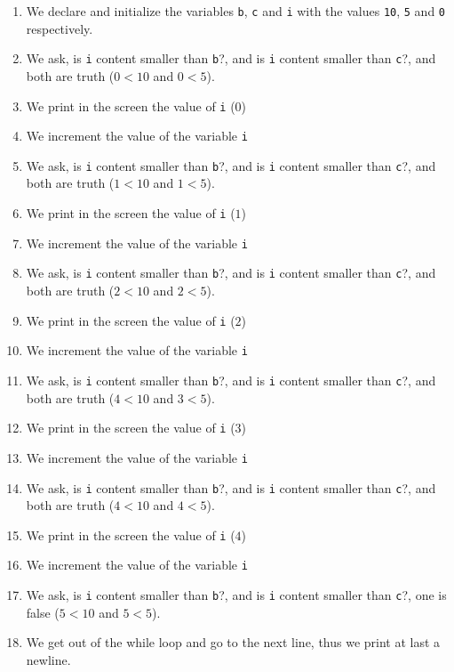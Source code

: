 \documentclass[]{book}
\providecommand{\tightlist}{%
  \setlength{\itemsep}{0pt}\setlength{\parskip}{0pt}}
\begin{document}
\begin{minipage}{\linewidth}
\begin{minipage}[t]{.485\linewidth}
\begin{enumerate}
\def\labelenumi{\arabic{enumi}.}
\tightlist
\item
  We declare and initialize the variables \texttt{b}, \texttt{c} and
  \texttt{i} with the values \texttt{10}, \texttt{5} and \texttt{0}
  respectively.
\item
  We ask, is \texttt{i} content smaller than \texttt{b}?, and is
  \texttt{i} content smaller than \texttt{c}?, and both are truth
  (\(0<10\) and \(0<5\)).
\item
  We print in the screen the value of \texttt{i} (\(0\))
\item
  We increment the value of the variable \texttt{i}
\item
  We ask, is \texttt{i} content smaller than \texttt{b}?, and is
  \texttt{i} content smaller than \texttt{c}?, and both are truth
  (\(1<10\) and \(1<5\)).
\item
  We print in the screen the value of \texttt{i} (\(1\))
\item
  We increment the value of the variable \texttt{i}
\item
  We ask, is \texttt{i} content smaller than \texttt{b}?, and is
  \texttt{i} content smaller than \texttt{c}?, and both are truth
  (\(2<10\) and \(2<5\)).
\item
  We print in the screen the value of \texttt{i} (\(2\))
\item
  We increment the value of the variable \texttt{i}
\item
  We ask, is \texttt{i} content smaller than \texttt{b}?, and is
  \texttt{i} content smaller than \texttt{c}?, and both are truth
  (\(4<10\) and \(3<5\)).
\item
  We print in the screen the value of \texttt{i} (\(3\))
\item
  We increment the value of the variable \texttt{i}
\item
  We ask, is \texttt{i} content smaller than \texttt{b}?, and is
  \texttt{i} content smaller than \texttt{c}?, and both are truth
  (\(4<10\) and \(4<5\)).
\item
  We print in the screen the value of \texttt{i} (\(4\))
\item
  We increment the value of the variable \texttt{i}
\item
  We ask, is \texttt{i} content smaller than \texttt{b}?, and is
  \texttt{i} content smaller than \texttt{c}?, one is false (\(5<10\)
  and \(5<5\)).
\item
  We get out of the while loop and go to the next line, thus we print at
  last a newline.
\end{enumerate}

\end{minipage}
\end{minipage}
\end{document}
